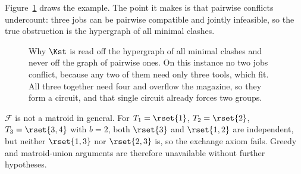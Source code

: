 Figure~\ref{fig:hypergraph} draws the example. The point it makes is that pairwise
conflicts undercount: three jobs can be pairwise compatible and jointly infeasible,
so the true obstruction is the hypergraph of all minimal clashes.

\begin{figure}[ht]\centering
{}
\caption{Why $\Kst$ is read off the hypergraph of all minimal clashes and never off
the graph of pairwise ones. On this instance no two jobs conflict, because any two of
them need only three tools, which fit. All three together need four and overflow the
magazine, so they form a circuit, and that single circuit already forces two groups.}
\label{fig:hypergraph}
\end{figure}

\begin{proposition}\label{prop:nonmatroid}
$\mathcal{F}$ is not a matroid in general. For $T_1=\rset{1}$, $T_2=\rset{2}$,
$T_3=\rset{3,4}$ with $b=2$, both $\rset{3}$ and $\rset{1,2}$ are independent, but
neither $\rset{1,3}$ nor $\rset{2,3}$ is, so the exchange axiom fails. Greedy and
matroid-union arguments are therefore unavailable without further hypotheses.
\end{proposition}

